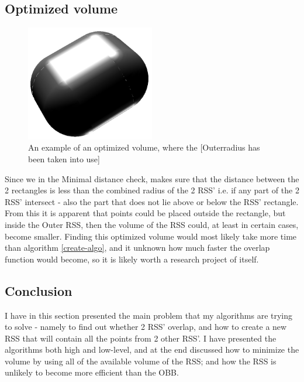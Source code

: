\subsection{Optimized volume} 
\begin{figure}
\centering
\includegraphics[width=0.5\textwidth]{figures/normalInter}
\caption{\label{optimized-volume}An example of an optimized volume, where the [Outerradius has been taken into use]}
\end{figure}

Since we in the Minimal distance check, makes sure that the distance between the 2 rectangles is less than the combined radius of the 2 RSS' i.e. if any part of the 2 RSS' intersect - also the part that does not lie above or below the RSS' rectangle. From this it is apparent that points could be placed outside the rectangle, but inside the Outer RSS, then the volume of the RSS could, at least in certain cases, become smaller. Finding this optimized volume would most likely take more time than algorithm \ref{create-algo}, and it unknown how much faster the overlap function would become, so it is likely worth a research project of itself. 

\subsection{Conclusion}
I have in this section presented the main problem that my algorithms are trying to solve - namely to find out whether 2 RSS' overlap, and how to create a new RSS that will contain all the points from 2 other RSS'. I have presented the algorithms both high and low-level, and at the end discussed how to minimize the volume by using all of the available volume of the RSS; and how the RSS is unlikely to become more efficient than the OBB.
